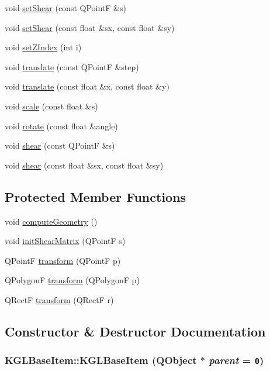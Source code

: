 \begin{CompactItemize}
\item 
void \hyperlink{class_k_g_l_base_item_c66fae31fcfb2261694c8ec120cb314c}{setShear} (const QPointF \&s)
\item 
void \hyperlink{class_k_g_l_base_item_19095252a25d1c9fdcf1950625ed81e4}{setShear} (const float \&sx, const float \&sy)
\item 
void \hyperlink{class_k_g_l_base_item_e29dcbe6e797fd4c6aef59acadb5ba48}{setZIndex} (int i)
\item 
void \hyperlink{class_k_g_l_base_item_a953c569ebcb00d8e9f8a7a88a730930}{translate} (const QPointF \&step)
\item 
void \hyperlink{class_k_g_l_base_item_69f7ca20cd192bd7ccc5bfdaeac4e60e}{translate} (const float \&x, const float \&y)
\item 
void \hyperlink{class_k_g_l_base_item_03c0cf1d821aebbe56d0a15681c17f1f}{scale} (const float \&s)
\item 
void \hyperlink{class_k_g_l_base_item_e3f4ea29b0d2da2a296ddbb80ea88738}{rotate} (const float \&angle)
\item 
void \hyperlink{class_k_g_l_base_item_a7cb811a03472f52dd7f6090a305bc30}{shear} (const QPointF \&s)
\item 
void \hyperlink{class_k_g_l_base_item_a81489bbb8b7ebe54129eab7b56d8b1a}{shear} (const float \&sx, const float \&sy)
\end{CompactItemize}
\subsection*{Protected Member Functions}
\begin{CompactItemize}
\item 
void \hyperlink{class_k_g_l_base_item_4fb2662f683c8d710039f229583c8c1c}{computeGeometry} ()
\item 
void \hyperlink{class_k_g_l_base_item_628f1737fb9ec96f4296798f86a2fcdb}{initShearMatrix} (QPointF s)
\item 
QPointF \hyperlink{class_k_g_l_base_item_3825639b143ff214e96749f375449675}{transform} (QPointF p)
\item 
QPolygonF \hyperlink{class_k_g_l_base_item_8df2be0816e3d24bf9adb5f0a01d186b}{transform} (QPolygonF p)
\item 
QRectF \hyperlink{class_k_g_l_base_item_fd255933afb0b5eb06de5ac1358f7e24}{transform} (QRectF r)
\end{CompactItemize}


\subsection{Constructor \& Destructor Documentation}
\hypertarget{class_k_g_l_base_item_9743d8f5ce7ec1de26267c6d34bf6303}{
\subsubsection[{KGLBaseItem}]{\setlength{\rightskip}{0pt plus 5cm}KGLBaseItem::KGLBaseItem (QObject $\ast$ {\em parent} = {\tt 0})}}
\label{class_k_g_l_base_item_9743d8f5ce7ec1de26267c6d34bf6303}



